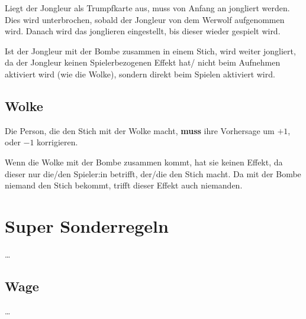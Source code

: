 \documentclass[3pt]{article}
\begin{document}
Liegt der Jongleur als Trumpfkarte aus, muss von Anfang an jongliert werden.
Dies wird unterbrochen, sobald der Jongleur von dem Werwolf aufgenommen wird.
Danach wird das jonglieren eingestellt, bis dieser wieder gespielt wird.

Ist der Jongleur mit der Bombe zusammen in einem Stich, wird weiter jongliert, da der Jongleur keinen Spielerbezogenen Effekt hat/ nicht beim Aufnehmen aktiviert wird (wie die Wolke), sondern direkt beim Spielen aktiviert wird.

\subsection{Wolke}
Die Person, die den Stich mit der Wolke macht, \textbf{muss} ihre Vorhersage um $+1$, oder $-1$ korrigieren.

Wenn die Wolke mit der Bombe zusammen kommt, hat sie keinen Effekt, da dieser nur die/den Spieler:in betrifft, der/die den Stich macht.
Da mit der Bombe niemand den Stich bekommt, trifft dieser Effekt auch niemanden.


\section{Super Sonderregeln}
\ldots

\subsection{Wage}
\ldots
\end{document}
